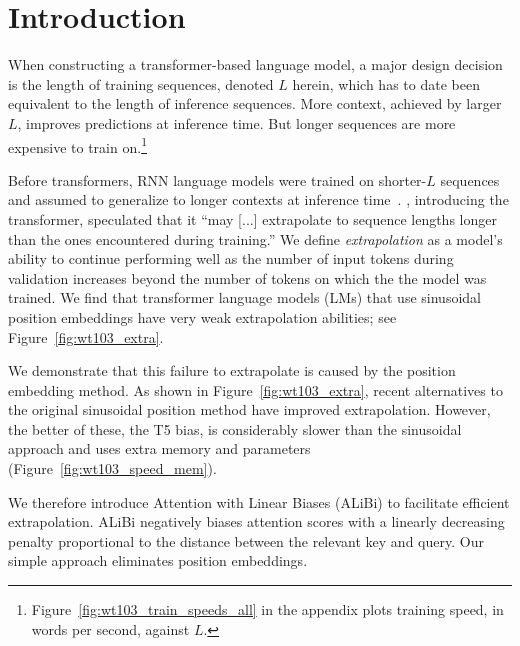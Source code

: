 



\section{Introduction}
\label{sec:intro}




When constructing a transformer-based language model, a major design decision is the length of training sequences, denoted $L$ herein, which has to date  been equivalent to the length of inference sequences.  More context, achieved by larger $L$, improves predictions at inference time.  But longer sequences are more expensive to train on.\footnote{Figure~\ref{fig:wt103_train_speeds_all} in the appendix plots training speed, in words per second, against $L$.}  


Before transformers, RNN language models were trained on shorter-$L$ sequences and assumed to generalize to longer contexts at inference time~\citep{Mikolov2010RecurrentNN, Mikolov2012ContextDR, zaremba2014recurrent}.  \citet{vaswani}, introducing the transformer, speculated that it ``may [...] extrapolate to sequence lengths longer than the ones encountered during training.''  
We define \emph{extrapolation} as a model's ability to continue performing well as the number of input tokens during validation increases beyond the number of tokens on which the the model was trained. 
We find that transformer language models (LMs)  that use sinusoidal position embeddings have very weak  %
extrapolation abilities; see Figure~\ref{fig:wt103_extra}.












We demonstrate that this failure to extrapolate is caused by the position embedding method.  As shown in Figure~\ref{fig:wt103_extra}, recent alternatives to the original sinusoidal position method \citep{roformer,t5} have improved extrapolation.  However, the better of these, the T5 bias, is considerably slower than the sinusoidal approach and uses extra memory and parameters (Figure~\ref{fig:wt103_speed_mem}).



We therefore introduce Attention with Linear Biases (ALiBi) to facilitate  efficient extrapolation. %
ALiBi negatively biases attention scores with a linearly decreasing penalty proportional to the distance between the relevant key and query. Our simple approach eliminates position embeddings. %



